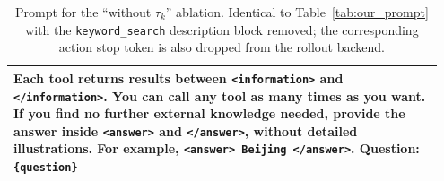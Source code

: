 \documentclass[11pt]{article}
\begin{document}
\begin{table}[t]
\begin{tabular}{p{0.95\linewidth}}
Each tool returns results between \texttt{\textless{}information\textgreater{}} and \texttt{\textless{}/information\textgreater{}}. You can call any tool as many times as you want. If you find no further external knowledge needed, provide the answer inside \texttt{\textless{}answer\textgreater{}} and \texttt{\textless{}/answer\textgreater{}}, without detailed illustrations. For example, \texttt{\textless{}answer\textgreater{} Beijing \textless{}/answer\textgreater{}}. Question: \texttt{\{question\}} \\
\hline
\end{tabular}
\caption{Prompt for the ``without $\tau_k$'' ablation. Identical to Table~\ref{tab:our_prompt} with the \texttt{keyword\_search} description block removed; the corresponding action stop token is also dropped from the rollout backend.}
\label{tab:prompt_no_keyword}
\end{table}
\end{document}
